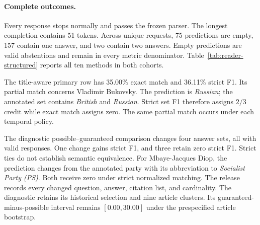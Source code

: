 \paragraph{Complete outcomes.}
Every response stops normally and passes the frozen parser.
The longest completion contains 51 tokens.
Across unique requests, 75 predictions are empty, 157 contain one answer, and two contain two answers.
Empty predictions are valid abstentions and remain in every metric denominator.
Table~\ref{tab:reader-structured} reports all ten methods in both cohorts.

The title-aware primary row has 35.00\% exact match and 36.11\% strict F1.
Its partial match concerns Vladimir Bukovsky.
The prediction is \emph{Russian}; the annotated set contains \emph{British} and \emph{Russian}.
Strict set F1 therefore assigns $2/3$ credit while exact match assigns zero.
The same partial match occurs under each temporal policy.

The diagnostic possible--guaranteed comparison changes four answer sets, all with valid responses.
One change gains strict F1, and three retain zero strict F1.
Strict ties do not establish semantic equivalence.
For Mbaye-Jacques Diop, the prediction changes from the annotated party with its abbreviation to \emph{Socialist Party (PS)}.
Both receive zero under strict normalized matching.
The release records every changed question, answer, citation list, and cardinality.
The diagnostic retains its historical selection and nine article clusters.
Its guaranteed-minus-possible interval remains $[0.00,30.00]$ under the prespecified article bootstrap.
